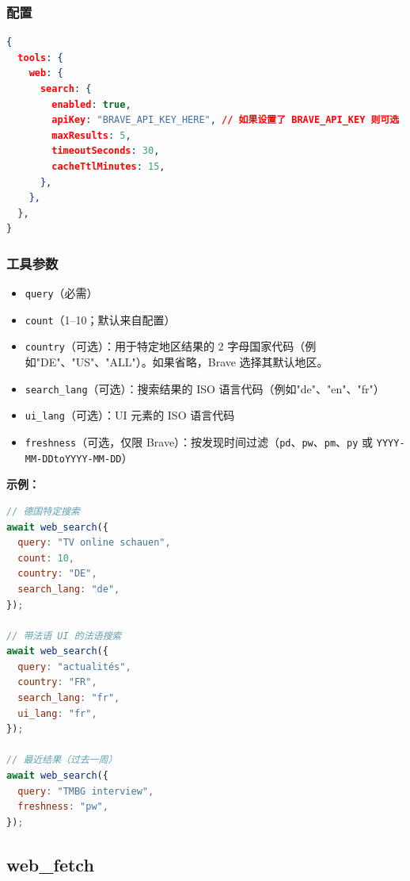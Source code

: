 \subsubsection{配置}


\begin{lstlisting}[language=json]
{
  tools: {
    web: {
      search: {
        enabled: true,
        apiKey: "BRAVE_API_KEY_HERE", // 如果设置了 BRAVE_API_KEY 则可选
        maxResults: 5,
        timeoutSeconds: 30,
        cacheTtlMinutes: 15,
      },
    },
  },
}
\end{lstlisting}


\subsubsection{工具参数}


\begin{itemize}
  \item \texttt{query}（必需）
  \item \texttt{count}（1–10；默认来自配置）
  \item \texttt{country}（可选）：用于特定地区结果的 2 字母国家代码（例如"DE"、"US"、"ALL"）。如果省略，Brave 选择其默认地区。
  \item \texttt{search\_lang}（可选）：搜索结果的 ISO 语言代码（例如"de"、"en"、"fr"）
  \item \texttt{ui\_lang}（可选）：UI 元素的 ISO 语言代码
  \item \texttt{freshness}（可选，仅限 Brave）：按发现时间过滤（\texttt{pd}、\texttt{pw}、\texttt{pm}、\texttt{py} 或 \texttt{YYYY-MM-DDtoYYYY-MM-DD}）
\end{itemize}


\textbf{示例：}

\begin{lstlisting}[language=javascript]
// 德国特定搜索
await web_search({
  query: "TV online schauen",
  count: 10,
  country: "DE",
  search_lang: "de",
});

// 带法语 UI 的法语搜索
await web_search({
  query: "actualités",
  country: "FR",
  search_lang: "fr",
  ui_lang: "fr",
});

// 最近结果（过去一周）
await web_search({
  query: "TMBG interview",
  freshness: "pw",
});
\end{lstlisting}


\subsection{web\_fetch}



